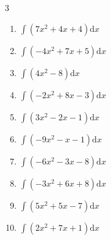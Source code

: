 \begin{multicols}{3}
\begin{enumerate}
\columnbreak %

  \item $\displaystyle \int \left( 7x^{2}+4x+4 \right) \mathrm{d}x$


  \item $\displaystyle \int \left( -4x^{2}+7x+5 \right) \mathrm{d}x$


  \item $\displaystyle \int \left( 4x^{2}-8 \right) \mathrm{d}x$


  \item $\displaystyle \int \left( -2x^{2}+8x-3 \right) \mathrm{d}x$


  \item $\displaystyle \int \left( 3x^{2}-2x-1 \right) \mathrm{d}x$


  \item $\displaystyle \int \left( -9x^{2}-x-1 \right) \mathrm{d}x$


  \item $\displaystyle \int \left( -6x^{2}-3x-8 \right) \mathrm{d}x$


  \item $\displaystyle \int \left( -3x^{2}+6x+8 \right) \mathrm{d}x$


  \item $\displaystyle \int \left( 5x^{2}+5x-7 \right) \mathrm{d}x$


  \item $\displaystyle \int \left( 2x^{2}+7x+1 \right) \mathrm{d}x$



\end{enumerate}
\end{multicols}
